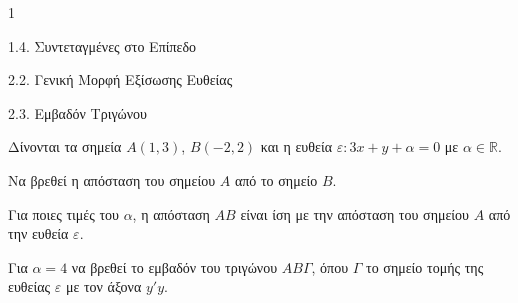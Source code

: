 \begin{ylh}{1}
    \item 1.4. Συντεταγμένες στο Επίπεδο
    \item 2.2. Γενική Μορφή Εξίσωσης Ευθείας
    \item 2.3. Εμβαδόν Τριγώνου
\end{ylh}
Δίνονται τα σημεία $A(1,3)$, $B(-2,2)$ και η ευθεία $\varepsilon: 3x+y+\alpha = 0$ με $\alpha \in \mathbb{R}$.
\begin{alist}
\item Να βρεθεί η απόσταση του σημείου $A$ από το σημείο $B$. 
\item Για ποιες τιμές του $\alpha$, η απόσταση $AB$ είναι ίση με την απόσταση του σημείου $A$ από την ευθεία $\varepsilon$. 
\item Για $\alpha = 4$ να βρεθεί το εμβαδόν του τριγώνου $AB\Gamma$, όπου $\Gamma$ το σημείο τομής της ευθείας $\varepsilon$ με τον άξονα $y'y$. 
\end{alist}